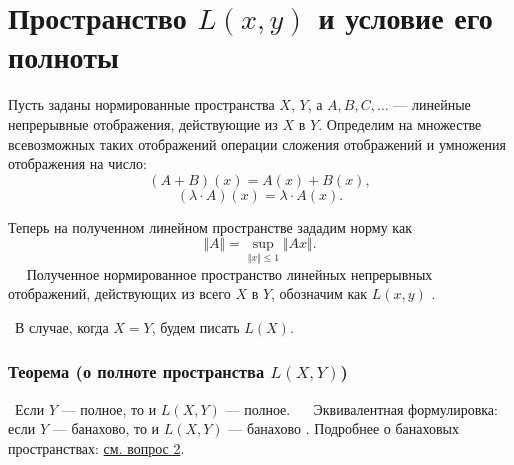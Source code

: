 \section{Пространство $L(x, y)$ и условие его полноты}
\label{sec:q-11}
Пусть заданы нормированные пространства $X$, $Y$, а $A, B, C, \dots$ --- линейные непрерывные отображения, действующие из $X$ в  $Y$. Определим на множестве всевозможных таких отображений операции сложения отображений и умножения отображения на число:
$$(A+B)(x)=A(x)+B(x),$$
$$(\lambda\cdot A)(x)=\lambda\cdot A(x).$$

Теперь на полученном линейном пространстве зададим норму как
 $$\Vert A \Vert = \sup_{\Vert x \Vert \leqslant 1} \Vert Ax \Vert.$$
 
 Полученное нормированное пространство линейных непрерывных отображений, действующих из всего $X$ в $Y$, обозначим как $L(x, y)$ \cite[с.~118]{trenogin}.

 В случае, когда $X = Y$, будем писать $L(X)$.
 
 \subsubsection*{Теорема (о полноте пространства $L(X,Y)$)}
 Если $Y$ --- полное, то и $L(X, Y)$ --- полное.
 
 Эквивалентная формулировка: если $Y$ --- банахово, то и $L(X, Y)$ --- банахово \cite[с.~120]{trenogin}. Подробнее о банаховых пространствах: \hyperref[sec:q-2]{см. вопрос 2}.